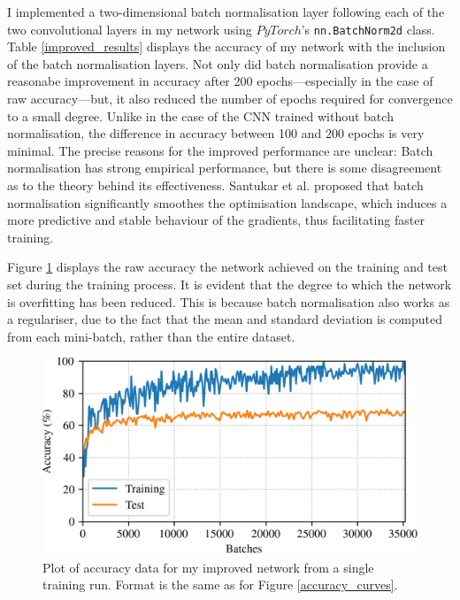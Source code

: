 \documentclass[conference]{IEEEtran}
\begin{document}
I implemented a two-dimensional batch normalisation layer following each of the two convolutional layers in my network using $PyTorch$'s \texttt{nn.BatchNorm2d} class.
Table \ref{improved_results} displays the accuracy of my network with the inclusion of the batch normalisation layers.
Not only did batch normalisation provide a reasonabe improvement in accuracy after 200 epochs---especially in the case of raw accuracy---but, it also reduced the number of epochs required for convergence to a small degree.
Unlike in the case of the CNN trained without batch normalisation, the difference in accuracy between 100 and 200 epochs is very minimal.
The precise reasons for the improved performance are unclear: Batch normalisation has strong empirical performance, but there is some disagreement as to the theory behind its effectiveness.
Santukar et al. \cite{SanturkarEtAl} proposed that batch normalisation significantly smoothes the optimisation landscape, which induces a more predictive and stable behaviour of the gradients, thus facilitating faster training.

Figure \ref{accuracy_curves_improved} displays the raw accuracy the network achieved on the training and test set during the training process.
It is evident that the degree to which the network is overfitting has been reduced.
This is because batch normalisation also works as a regulariser, due to the fact that the mean and standard deviation is computed from each mini-batch, rather than the entire dataset.

\begin{figure}[htbp]
    \centerline{\includegraphics[width=\columnwidth]{accuracy_improved.png}}
    \caption{
        Plot of accuracy data for my improved network from a single training run.
        Format is the same as for Figure \ref{accuracy_curves}.
    }
    \label{accuracy_curves_improved}
\end{figure}
\end{document}
